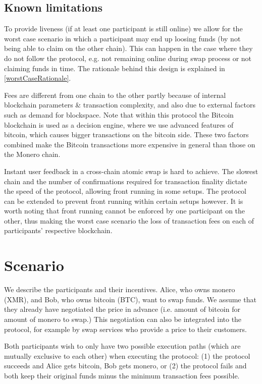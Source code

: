 \documentclass{llncs}
\begin{document}
\subsection{Known limitations}
To provide liveness (if at least one participant is still online) we allow for the worst case scenario in which a participant may end up loosing funds (by not being able to claim on the other chain). This can happen in the case where they do not follow the protocol, e.g. not remaining online during swap process or not claiming funds in time. The rationale behind this design is explained in \ref{worstCaseRationale}.

Fees are different from one chain to the other partly because of internal blockchain parameters \& transaction complexity, and also due to external factors such as demand for blockspace. Note that within this protocol the Bitcoin blockchain is used as a decision engine, where we use advanced features of bitcoin, which causes bigger transactions on the bitcoin side. These two factors combined make the Bitcoin transactions more expensive in general than those on the Monero chain.

Instant user feedback in a cross-chain atomic swap is hard to achieve.  The slowest chain and the number of confirmations required for transaction finality dictate the speed of the protocol, allowing front running in some setups. The protocol can be extended to prevent front running within certain setups however. It is worth noting that front running cannot be enforced by one participant on the other, thus making the worst case scenario the loss of transaction fees on each of participants' respective blockchain.

\section{Scenario}
We describe the participants and their incentives. Alice, who owns monero (XMR), and Bob, who owns bitcoin (BTC), want to swap funds. We assume that they already have negotiated the price in advance (i.e. amount of bitcoin for amount of monero to swap.) This negotiation can also be integrated into the protocol, for example by swap services who provide a price to their customers.

Both participants wish to only have two possible execution paths (which are mutually exclusive to each other) when executing the protocol: (1) the protocol succeeds and Alice gets bitcoin, Bob gets monero, or (2) the protocol fails and both keep their original funds minus the minimum transaction fees possible.
\end{document}
